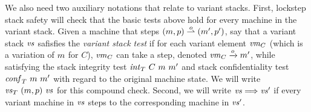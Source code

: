 \documentclass[acmsmall,review,anonymous]{acmart}\settopmatter{printfolios=true,printccs=false,printacmref=false}
\begin{document}



We also need two auxiliary notations that relate to variant stacks.
%
First, lockstep stack safety will check that the basic tests above hold for every
machine in the variant stack.  Given a machine that steps $(m,
p) \overset{o}{\rightharpoonup} (m', p')$, say that a variant
stack $\mathit{vs}$ safisfies the \emph{variant stack test} if for each
variant element $\mathit{vm}_{C}$ (which is a variation of $m$ for $C$),
$\mathit{vm}_{C}$ can take a step, denoted $\mathit{vm}_{C} \xrightarrow{o} m'$,
while satisfying the stack integrity test $\mathit{int}_T ~ C ~ m ~ m'$
and stack confidentiality test $\mathit{conf}_T ~ m ~ m'$ with regard
to the original machine state. We will write $\mathit{\mathit{vs}}_T ~ (m,
  p) ~ \mathit{vs}$ for this compound check.
%
Second, we will write $\mathit{vs} \Longrightarrow \mathit{vs}'$ if every variant machine
in $\mathit{vs}$ steps to the corresponding machine in $\mathit{vs}'$.
%
\end{document}
